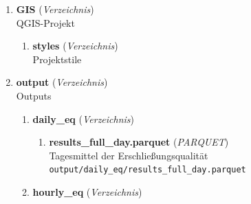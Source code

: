 \begin{enumerate}[label=\arabic*, leftmargin=*, itemsep=0.5em, topsep=0.3em]
\begin{enumerate}[label=\arabic{enumi}.\arabic*, leftmargin=*, itemsep=0.5em, topsep=0.3em]
Zensusgitter (bewohnte Zellen)\\
\texttt{\small geodata/zensus.gpkg}
\item \textbf{zentrale\_orte\_area.gpkg} \textnormal{(\textit{GeoPackage})}\\
Vektorisierte und klassifizierte Ergebnisse der Kerndichtenschätzung\\
\texttt{\small geodata/zentrale\_orte\_area.gpkg}
\begin{enumerate}[label=\arabic{enumi}.\arabic{enumii}.\arabic*, leftmargin=*, itemsep=0.5em, topsep=0.3em]
\item \textbf{areas\_flex\_catcount} \textnormal{(\textit{Layer})}\\
Dichteflächen, ermittelt aus den Ergebnissen der KDE, mit Anzahl der vorhandenen POI nach Kategorie
\item \textbf{acc\_scoring\_centroids} \textnormal{(\textit{Layer})}\\
Nach der in Abschnitt 3.3.2.1 beschriebenen Methode bewertete Zentroide der Dichteflächen
\end{enumerate}
\end{enumerate}
\item \textbf{GIS} \textnormal{(\textit{Verzeichnis})}\\
QGIS-Projekt
\begin{enumerate}[label=\arabic{enumi}.\arabic*, leftmargin=*, itemsep=0.5em, topsep=0.3em]
\item \textbf{styles} \textnormal{(\textit{Verzeichnis})}\\
Projektstile
\end{enumerate}
\item \textbf{output} \textnormal{(\textit{Verzeichnis})}\\
Outputs
\begin{enumerate}[label=\arabic{enumi}.\arabic*, leftmargin=*, itemsep=0.5em, topsep=0.3em]
\item \textbf{daily\_eq} \textnormal{(\textit{Verzeichnis})}
\begin{enumerate}[label=\arabic{enumi}.\arabic{enumii}.\arabic*, leftmargin=*, itemsep=0.5em, topsep=0.3em]
\item \textbf{results\_full\_day.parquet} \textnormal{(\textit{PARQUET})}\\
Tagesmittel der Erschließungsqualität\\
\texttt{\small output/daily\_eq/results\_full\_day.parquet}
\end{enumerate}
\item \textbf{hourly\_eq} \textnormal{(\textit{Verzeichnis})}

\end{enumerate}
\end{enumerate}

